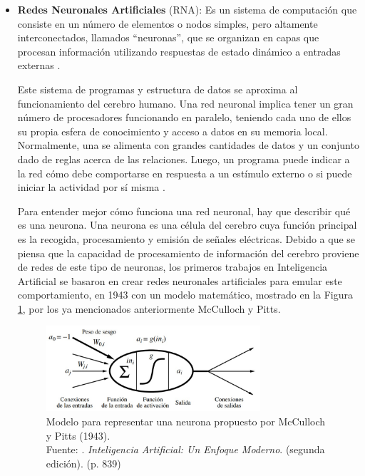 \begin{itemize}
	\item \textbf{Redes Neuronales Artificiales} (RNA): Es un sistema de computación que consiste en un número de elementos o nodos simples, pero altamente interconectados, llamados “neuronas”, que se organizan en capas que procesan información utilizando respuestas de estado dinámico a entradas externas \parencite{tec_inzaugarat2018ann}.
	
	Este sistema de programas y estructura de datos se aproxima al funcionamiento del cerebro humano. Una red neuronal implica tener un gran número de procesadores funcionando en paralelo, teniendo cada uno de ellos su propia esfera de conocimiento y acceso a datos en su memoria local. Normalmente, una se alimenta con grandes cantidades de datos y un conjunto dado de reglas acerca de las relaciones. Luego, un programa puede indicar a la red cómo debe comportarse en respuesta a un estímulo externo o si puede iniciar la actividad por sí misma \parencite{tec_banafa2019deeplearning}.
	
	Para entender mejor cómo funciona una red neuronal, hay que describir qué es una neurona. Una neurona es una célula del cerebro cuya función principal es la recogida, procesamiento y emisión de señales eléctricas. Debido a que se piensa que la capacidad de procesamiento de información del cerebro proviene de redes de este tipo de neuronas, los primeros trabajos en Inteligencia Artificial se basaron en crear redes neuronales artificiales para emular este comportamiento, en 1943 con un modelo matemático, mostrado en la Figura \ref{2:fig12}, por los ya mencionados anteriormente McCulloch y Pitts.
	\begin{figure}[h]
		\begin{center}
			\includegraphics[width=0.75\textwidth]{2/figures/rnn_mcculloch.jpg}
			\caption[Modelo para representar una neurona propuesto por McCulloch y Pitts (1943)]{Modelo para representar una neurona propuesto por McCulloch y Pitts (1943).\\
			Fuente: \cite{bk_russell2004intart}. \textit{Inteligencia Artificial: Un Enfoque Moderno}. (segunda edición). (p. 839)}
			\label{2:fig12}
		\end{center}
	\end{figure}


\end{itemize}
